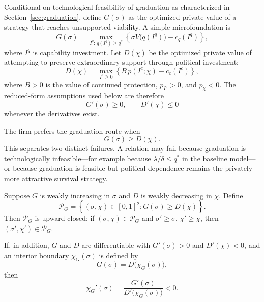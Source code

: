 Conditional on technological feasibility of graduation as characterized in Section~\ref{sec:graduation}, define $G(\sigma)$ as the optimized private value of a strategy that reaches unsupported viability. A simple microfoundation is
\begin{equation}
G(\sigma)
=
\max_{I^q:\,q(I^q)\ge q^*}
\left\{
\sigma V\bigl(q(I^q)\bigr)-c_q(I^q)
\right\},
\label{eq:graduation-route-value}
\end{equation}
where $I^q$ is capability investment. Let $D(\chi)$ be the optimized private value of attempting to preserve extraordinary support through political investment:
\begin{equation}
D(\chi)
=
\max_{I^c\ge0}
\left\{
B\,p(I^c;\chi)-c_c(I^c)
\right\},
\label{eq:dependence-route-value}
\end{equation}
where $B>0$ is the value of continued protection, $p_{I^c}>0$, and $p_{\chi}<0$. The reduced-form assumptions used below are therefore
\begin{equation}
G'(\sigma)\ge0,
\qquad
D'(\chi)\le0
\label{eq:credibility-monotonicity}
\end{equation}
whenever the derivatives exist.

The firm prefers the graduation route when
\begin{equation}
G(\sigma)\ge D(\chi).
\label{eq:graduation-preferred}
\end{equation}
This separates two distinct failures. A relation may fail because graduation is technologically infeasible---for example because $\lambda/\delta\le q^*$ in the baseline model---or because graduation is feasible but political dependence remains the privately more attractive survival strategy.

\begin{proposition}
\label{prop:playing-field}
Suppose $G$ is weakly increasing in $\sigma$ and $D$ is weakly decreasing in $\chi$. Define
\begin{equation}
\mathcal P_G
=
\left\{(\sigma,\chi)\in[0,1]^2:
G(\sigma)\ge D(\chi)
\right\}.
\end{equation}
Then $\mathcal P_G$ is upward closed: if $(\sigma,\chi)\in\mathcal P_G$ and $\sigma'\ge\sigma$, $\chi'\ge\chi$, then $(\sigma',\chi')\in\mathcal P_G$.

If, in addition, $G$ and $D$ are differentiable with $G'(\sigma)>0$ and $D'(\chi)<0$, and an interior boundary $\chi_G(\sigma)$ is defined by
\begin{equation}
G(\sigma)=D\bigl(\chi_G(\sigma)\bigr),
\end{equation}
then
\begin{equation}
\chi_G'(\sigma)
=
\frac{G'(\sigma)}{D'\bigl(\chi_G(\sigma)\bigr)}
<0.
\label{eq:playing-field-frontier}
\end{equation}
\end{proposition}

